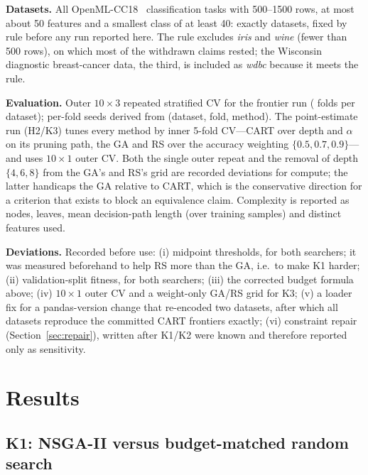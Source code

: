 \documentclass[sigconf,review,anonymous]{acmart}
\newcommand{\GA}{GA\xspace}
\newcommand{\RS}{RS\xspace}
\begin{document}
\textbf{Datasets.} All OpenML-CC18~\cite{bischl2021,vanschoren2014} classification tasks
with 500--1500 rows, at most about 50 features and a smallest class of at least 40:
exactly \NDatasets{} datasets, fixed by rule before any run reported here. The rule
excludes \emph{iris} and \emph{wine} (fewer than 500 rows), on which most of the withdrawn
claims rested; the Wisconsin diagnostic breast-cancer data, the third, is included as
\emph{wdbc} because it meets the rule.

\textbf{Evaluation.} Outer $10\times3$ repeated stratified CV for the frontier run
(\NFoldsFrontier{} folds per dataset); per-fold seeds derived from (dataset, fold,
method). The point-estimate run (H2/K3) tunes every method by inner 5-fold CV---CART
over depth and $\alpha$ on its pruning path, the \GA and \RS{} over the accuracy weighting
$\{0.5,0.7,0.9\}$---and uses $10\times1$ outer CV. Both the single outer repeat and the
removal of depth $\{4,6,8\}$ from the \GA's and \RS's grid are recorded deviations for
compute; the latter handicaps the \GA relative to CART, which is the conservative
direction for a criterion that exists to block an equivalence claim. Complexity is
reported as nodes, leaves, mean decision-path length (over training samples) and distinct features used.

\textbf{Deviations.} Recorded before use: (i) midpoint thresholds, for both searchers;
it was measured beforehand to help \RS{} more than the \GA, i.e.\ to make K1 harder;
(ii) validation-split fitness, for both searchers; (iii) the corrected budget formula
above; (iv) $10\times1$ outer CV and a weight-only \GA/\RS{} grid for K3; (v) a loader fix for a pandas-version change
that re-encoded two datasets, after which all \NDatasets{} datasets reproduce the
committed CART frontiers exactly; (vi) constraint repair (Section~\ref{sec:repair}),
written after K1/K2 were known and therefore reported only as sensitivity.

\section{Results}

\subsection{K1: NSGA-II versus budget-matched random search}
\end{document}
